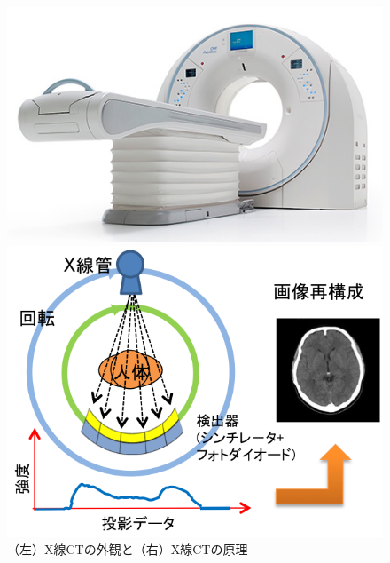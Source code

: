 \begin{figure}[H]
 \begin{minipage}{0.5\hsize}
  \begin{center}
  \includegraphics[bb=0.000000 0.000000 470.000000 293.000000,width=0.9\hsize]{image2/chapter1/toshibaCT.jpg} 
  \end{center}
  \vspace{-1cm}
  \caption*{}
 \end{minipage}
 \begin{minipage}{0.5\hsize}
  \begin{center}
 \includegraphics[bb=0.000000 0.000000 287.496234 222.221630,width=0.9\hsize]{image2/chapter1/CT_genri.png} 
  \end{center}
  \vspace{-1cm}
  \caption*{}
 \end{minipage}
 \begin{center}
  \caption{（左）X線CTの外観と（右）X線CTの原理}
  \label{fig:gaikan}
  \end{center}
\end{figure}


